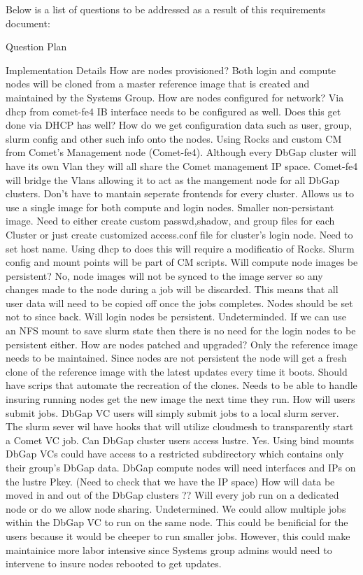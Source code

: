 Below is a list of questions to be addressed as a result of this 
requirements document:

Question
Plan

Implementation Details
How are nodes provisioned?
Both login and compute nodes will be cloned from a master
reference image that is created and maintained by the Systems Group.
How are nodes configured for network?
Via dhcp from comet-fe4
IB interface needs to be configured as well.
Does this get done via DHCP has well?
      How do we get configuration data such as user, group, slurm config
and other such info onto the nodes.
 Using Rocks and custom CM from Comet's Management node (Comet-fe4). Although every
DbGap cluster will have its own Vlan they will all share the Comet management IP space.
Comet-fe4 will bridge the Vlans allowing it to act as the mangement node for all DbGap clusters.
Don't have to mantain seperate frontends for every cluster.
Allows us to use a single image for both compute and login nodes.
Smaller non-persistant image.
       Need to either create custom passwd,shadow, and group files
for each Cluster or just create customized access.conf file for
cluster's login node.
Need to set host name. Using dhcp to does this will require a
modificatio of Rocks.
Slurm config and mount points will be part of CM scripts.
  Will compute node images be persistent?
 No, node images will not be synced to the image server so any changes
made to the node during a job will be discarded. This means that all user
data will need to be copied off once the jobs completes.
  Nodes should be set not to since back.
 Will login nodes be persistent.
  Undeterminded. If we can use an NFS mount to save slurm state then there is
no need for the login nodes to be persistent either.
      How are nodes patched and upgraded?
Only the reference image needs to be maintained. Since nodes are not persistent the
node will get a fresh clone of the reference image with the latest updates every time it
boots.
   Should have scrips that automate the recreation of the
clones. Needs to be able to handle insuring running nodes
get the new image the next time they run.
 How will users submit jobs.
  DbGap VC users will simply submit jobs to a local slurm server. The slurm sever wil have
hooks that will utilize cloudmesh to transparently start a Comet VC job.
      Can DbGap cluster users access lustre.
Yes. Using bind mounts DbGap VCs could have access to a restricted subdirectory
which contains only their group's DbGap data.
   DbGap compute nodes will need interfaces and IPs on
the lustre Pkey. (Need to check that we have the IP
space)
 How will data be moved in and out of the DbGap clusters
  ??
    Will every job run on a dedicated node or do we allow node sharing.
Undetermined. We could allow multiple jobs within the DbGap VC to run on the same
node. This could be benificial for the users because it would be cheeper to run smaller
jobs. However, this could make maintainice more labor intensive since Systems group
admins would need to intervene to insure nodes rebooted to get updates.



